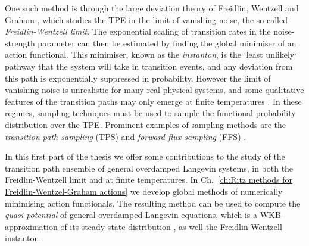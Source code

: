 \documentclass[]{cam-thesis}
\begin{document}
One such method is through the large deviation theory of Freidlin, Wentzell and Graham \citep{wentzellSmallRandomPerturbations1970, graham1987macroscopic}, which studies the TPE in the limit of vanishing noise, the so-called \textit{Freidlin-Wentzell limit}. The exponential scaling of transition rates in the noise-strength parameter can then be estimated by finding the global minimiser of an action functional. This minimiser, known as the \textit{instanton}, is the `least unlikely` pathway that the system will take in transition events, and any deviation from this path is exponentially suppressed in probability. However the limit of vanishing noise is unrealistic for many real physical systems, and some qualitative features of the transition paths may only emerge at finite temperatures \cite{pinskiTransitionPathsMolecules2010b}. In these regimes, sampling techniques must be used to sample the functional probability distribution over the TPE. Prominent examples of sampling methods are the \textit{transition path sampling} (TPS) \citep{dellagoTransitionPathSampling1998a, dellagoCalculationReactionRate1999a, dellagoEfficientTransitionPath1998, bolhuisTransitionPathSamplinga, bolhuisTransitionPathSampling2002a} and \textit{forward flux sampling} (FFS) \citep{escobedoTransitionPathSampling2009, allenForwardFluxSamplingtype2006, hussainStudyingRareEvents2020}. %

In this first part of the thesis we offer some contributions to the study of the transition path ensemble of general overdamped Langevin systems, in both the Freidlin-Wentzell limit and at finite temperatures. In Ch.~\ref{ch:Ritz methods for Freidlin-Wentzel-Graham actions} we develop global methods of numerically minimising action functionals. The resulting method can be used to compute the \textit{quasi-potential} of general overdamped Langevin equations, which is a WKB-approximation of its steady-state distribution \citep{graham1987macroscopic, maier1996scaling, ludwig1975persistence}, as well the Freidlin-Wentzell instanton. 
\end{document}
